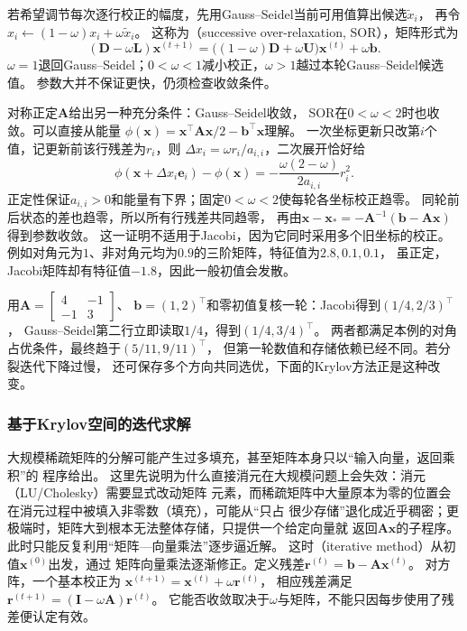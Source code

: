 若希望调节每次逐行校正的幅度，先用Gauss--Seidel当前可用值算出候选$\widetilde x_i$，
再令$x_i\gets(1-\omega)x_i+\omega\widetilde x_i$。
这称为（successive over-relaxation, SOR），矩阵形式为
\begin{equation}
 (\bm D-\omega\bm L)\bm x^{(t+1)}
 =\bigl((1-\omega)\bm D+\omega\bm U\bigr)\bm x^{(t)}+\omega\bm b.
 \label{eq:linear-algebra-sor-splitting}
\end{equation}
$\omega=1$退回Gauss--Seidel；$0<\omega<1$减小校正，$\omega>1$越过本轮Gauss--Seidel候选值。
参数大并不保证更快，仍须检查收敛条件。

对称正定$\bm A$给出另一种充分条件：Gauss--Seidel收敛，
SOR在$0<\omega<2$时也收敛。可以直接从能量
$\phi(\bm x)=\bm x^\top\bm A\bm x/2-\bm b^\top\bm x$理解。
一次坐标更新只改第$i$个值，记更新前该行残差为$r_i$，则
$\Delta x_i=\omega r_i/a_{i,i}$，二次展开恰好给
\[
 \phi(\bm x+\Delta x_i\bm e_i)-\phi(\bm x)
 =-\frac{\omega(2-\omega)}{2a_{i,i}}r_i^2.
\]
正定性保证$a_{i,i}>0$和能量有下界；固定$0<\omega<2$使每轮各坐标校正趋零。
同轮前后状态的差也趋零，所以所有行残差共同趋零，
再由$\bm x-\bm x_*= -\bm A^{-1}(\bm b-\bm A\bm x)$得到参数收敛。
这一证明不适用于Jacobi，因为它同时采用多个旧坐标的校正。
例如对角元为$1$、非对角元均为$0.9$的三阶矩阵，特征值为$2.8,0.1,0.1$，
虽正定，Jacobi矩阵却有特征值$-1.8$，因此一般初值会发散。

用$\bm A=\left[\begin{smallmatrix}4&-1\\-1&3\end{smallmatrix}\right]$、
$\bm b=(1,2)^\top$和零初值复核一轮：Jacobi得到$(1/4,2/3)^\top$，
Gauss--Seidel第二行立即读取$1/4$，得到$(1/4,3/4)^\top$。
两者都满足本例的对角占优条件，最终趋于$(5/11,9/11)^\top$，
但第一轮数值和存储依赖已经不同。若分裂迭代下降过慢，
还可保存多个方向共同选优，下面的Krylov方法正是这种改变。

\subsubsection{基于Krylov空间的迭代求解}
\label{sec:ch06-iterative-solvers}
\label{sec:ch06-conjugate-gradient}
\label{sec:ch06-gmres}

大规模稀疏矩阵的分解可能产生过多填充，甚至矩阵本身只以“输入向量，返回乘积”的
程序给出。
这里先说明为什么直接消元在大规模问题上会失效：消元（LU/Cholesky）需要显式改动矩阵
元素，而稀疏矩阵中大量原本为零的位置会在消元过程中被填入非零数（填充），可能从“只占
很少存储”退化成近乎稠密；更极端时，矩阵大到根本无法整体存储，只提供一个给定向量就
返回$\bm A\bm x$的子程序。此时只能反复利用“矩阵—向量乘法”逐步逼近解。
这时（iterative method）从初值$\bm x^{(0)}$出发，通过
矩阵向量乘法逐渐修正。定义残差$\bm r^{(t)}=\bm b-\bm A\bm x^{(t)}$。
对方阵，一个基本校正为
$\bm x^{(t+1)}=\bm x^{(t)}+\omega\bm r^{(t)}$，
相应残差满足$\bm r^{(t+1)}=(\bm I-\omega\bm A)\bm r^{(t)}$。
它能否收敛取决于$\omega$与矩阵，不能只因每步使用了残差便认定有效。

